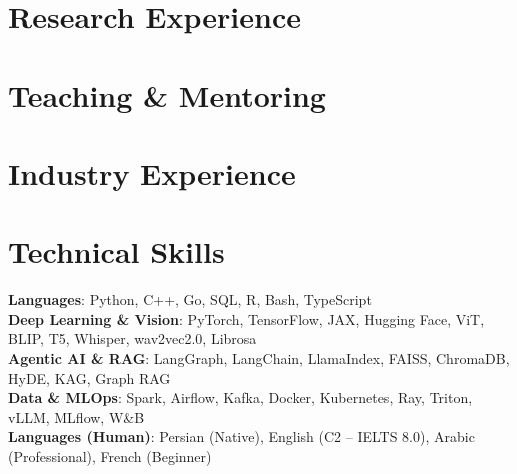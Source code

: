 \documentclass[letterpaper,11pt]{article}
\newenvironment{resumeSubHeadingList}{\begin{itemize}[leftmargin=0.15in, label={}]}{\end{itemize}}
\begin{document}
\section{Research Experience}
\begin{resumeSubHeadingList}
  
\end{resumeSubHeadingList}

\section{Teaching \& Mentoring}
\begin{resumeSubHeadingList}
  
\end{resumeSubHeadingList}

\section{Industry Experience}
\begin{resumeSubHeadingList}
  
\end{resumeSubHeadingList}

\section{Technical Skills}
\begin{itemize}[leftmargin=0.15in, label={}]
  \small{\item{
    \textbf{Languages}{: Python, C++, Go, SQL, R, Bash, TypeScript} \\
    \textbf{Deep Learning \& Vision}{: PyTorch, TensorFlow, JAX, Hugging Face, ViT, BLIP, T5, Whisper, wav2vec2.0, Librosa} \\
    \textbf{Agentic AI \& RAG}{: LangGraph, LangChain, LlamaIndex, FAISS, ChromaDB, HyDE, KAG, Graph RAG} \\
    \textbf{Data \& MLOps}{: Spark, Airflow, Kafka, Docker, Kubernetes, Ray, Triton, vLLM, MLflow, W\&B} \\
    \textbf{Languages (Human)}{: Persian (Native), English (C2 -- IELTS 8.0), Arabic (Professional), French (Beginner)}
  }}
\end{itemize}
\end{document}

